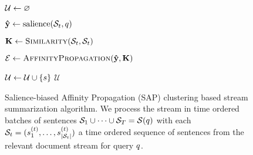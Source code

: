 \begin{figure}
\begin{algorithmic}[1] 
  \State $\mathcal{U} \gets \varnothing$ 

    
    \State $\mathbf{\hat{y}} \gets \operatorname{salience}(\mathcal{S}_t, q)$

     \State $\mathbf{K} \gets \textsc{Similarity}(\mathcal{S}_t, \mathcal{S}_t)$ 
    
    \State $\mathcal{E} \gets \textsc{AffinityPropagation}(\mathbf{\hat{y}}, \mathbf{K})$

    \For{$\strsent \in \exemplars$}
      \If{$\predSaliences_\strsent > \salThresh \wedge 
         \max_{\update \in \updates} 
           \similarity{\update}{\strsent} < \simThresh$}
        \State $\mathcal{U} \gets \mathcal{U} \cup \{s\}$
      \EndIf
    \EndFor
  \EndFor
  \State \Return $\mathcal{U}$
\EndProcedure
\end{algorithmic}
\caption{Salience-biased Affinity Propagation (SAP) clustering based 
   stream summarization algorithm. We process the stream in time
   ordered batches 
   of sentences $\mathcal{S}_1 \cup \cdots \cup \mathcal{S}_T = \mathcal{S}(q)$
   with each $\mathcal{S}_t = (s_1^{(t)}, \ldots, 
   s_{| \mathcal{S}_t |}^{(t)})$ a time ordered sequence of sentences 
   from the relevant document stream for query $q$.  }
    \label{alg:ts_sap_algo}
\end{figure}


